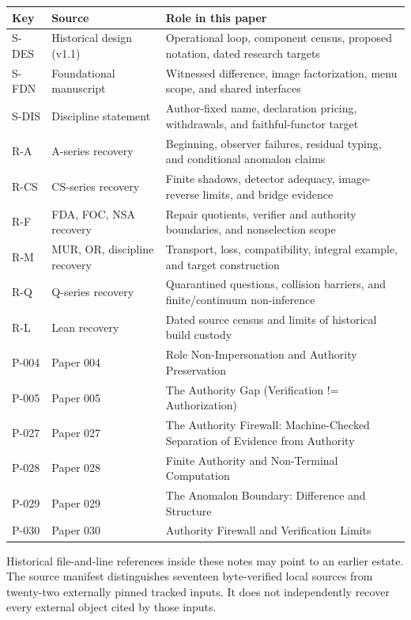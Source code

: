 \documentclass[
  11pt,
]{article}
\begin{document}
\begin{longtable}[]{@{}
  >{\raggedright\arraybackslash}p{}
  >{\raggedright\arraybackslash}p{}
  >{\raggedright\arraybackslash}p{}@{}}
\toprule\noalign{}
\begin{minipage}[b]{\linewidth}\raggedright
Key
\end{minipage} & \begin{minipage}[b]{\linewidth}\raggedright
Source
\end{minipage} & \begin{minipage}[b]{\linewidth}\raggedright
Role in this paper
\end{minipage} \\
\midrule\noalign{}
\endhead
\bottomrule\noalign{}
\endlastfoot
S-DES & Historical design (v1.1) & Operational loop, component census, proposed notation, dated research targets \\
S-FDN & Foundational manuscript & Witnessed difference, image factorization, menu scope, and shared interfaces \\
S-DIS & Discipline statement & Author-fixed name, declaration pricing, withdrawals, and faithful-functor target \\
R-A & A-series recovery & Beginning, observer failures, residual typing, and conditional anomalon claims \\
R-CS & CS-series recovery & Finite shadows, detector adequacy, image-reverse limits, and bridge evidence \\
R-F & FDA, FOC, NSA recovery & Repair quotients, verifier and authority boundaries, and nonselection scope \\
R-M & MUR, OR, discipline recovery & Transport, loss, compatibility, integral example, and target construction \\
R-Q & Q-series recovery & Quarantined questions, collision barriers, and finite/continuum non-inference \\
R-L & Lean recovery & Dated source census and limits of historical build custody \\
P-004 & Paper 004 & Role Non-Impersonation and Authority Preservation \\
P-005 & Paper 005 & The Authority Gap (Verification != Authorization) \\
P-027 & Paper 027 & The Authority Firewall: Machine-Checked Separation of Evidence from Authority \\
P-028 & Paper 028 & Finite Authority and Non-Terminal Computation \\
P-029 & Paper 029 & The Anomalon Boundary: Difference and Structure \\
P-030 & Paper 030 & Authority Firewall and Verification Limits \\
\end{longtable}

Historical file-and-line references inside these notes may point to an earlier estate. The source manifest distinguishes seventeen byte-verified local sources from twenty-two externally pinned tracked inputs. It does not independently recover every external object cited by those inputs.
\end{document}
